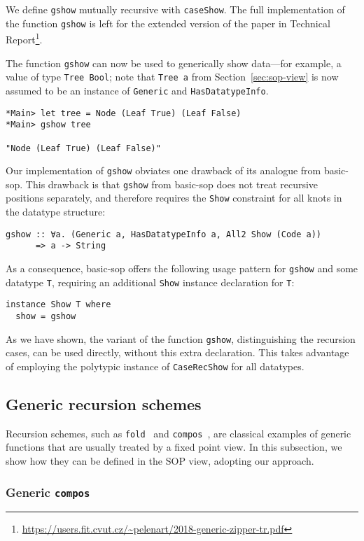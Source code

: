 \documentclass[runningheads]{llncs}
\newcommand{\K}[1]{\lstinline[style=fancy]{#1}}
\begin{document}
We define \K{gshow} mutually recursive with \K{caseShow}. The full implementation of the function \K{gshow} is left for the extended version of the paper in Technical Report\footnote{\url{https://users.fit.cvut.cz/~pelenart/2018-generic-zipper-tr.pdf}}.

The function \K{gshow} can now be used to generically show data---for example, a value of type \K{Tree Bool}; note that \K{Tree a} from Section~\ref{sec:sop-view} is now assumed to be an instance of \K{Generic} and \K{HasDatatypeInfo}.
\begin{lstlisting}[style=ttstyle]
*Main> let tree = Node (Leaf True) (Leaf False)
*Main> gshow tree

"Node (Leaf True) (Leaf False)"
\end{lstlisting}

Our implementation of \K{gshow} obviates one drawback of its analogue from \textsf{basic-sop}. This drawback is that \K{gshow} from \textsf{basic-sop} does not treat recursive positions separately, and therefore requires the \K{Show} constraint for all knots in the datatype structure:
\begin{lstlisting}[style=fancy]
gshow :: ∀a. (Generic a, HasDatatypeInfo a, All2 Show (Code a))
      => a -> String
\end{lstlisting}
As a consequence, \textsf{basic-sop} offers the following usage pattern for \K{gshow} and some datatype \K{T}, requiring an additional \K{Show} instance declaration for \K{T}:
\begin{lstlisting}[style=fancy]
instance Show T where
  show = gshow
\end{lstlisting}
As we have shown,  the variant of the function \K{gshow}, distinguishing the recursion cases, can be used directly, without this extra declaration. This takes advantage of employing the polytypic instance of \K{CaseRecShow} for all datatypes.


\subsection{Generic recursion schemes}
\label{subsec:rec-schemes}


Recursion schemes, such as \K{fold}~\cite{Meijer1991,MuRec2009} and \K{compos}~\cite{Bringert2006}, are classical examples of generic functions that are usually treated by a fixed point view. In this subsection, we show how they can be defined in the SOP view, adopting our approach.

\subsubsection{Generic \K{compos}}
\end{document}
